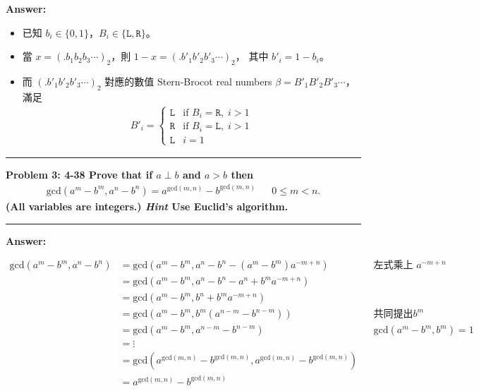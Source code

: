 \documentclass[11pt]{article}
\newcommand\question[2]{\vspace{.25in}\hrule\textbf{#1: #2}\vspace{.5em}\hrule\vspace{.10in}}
\renewcommand\part[1]{\vspace{.10in}\textbf{#1}}
\begin{document}
\part{Answer:}

\begin{itemize}
	\item 已知 $b_i \in \{0, 1\}$，$B_i \in \{\texttt{L}, \texttt{R}\}$。
	\item 當 $x = (.b_1 b_2 b_3 \cdots)_2$，則 $1-x = (.b'_1 b'_2 b'_3 \cdots)_2$，
		其中 $b'_i = 1 - b_i$。
	\item 而 $(.b'_1 b'_2 b'_3 \cdots)_2$ 對應的數值 Stern-Brocot real numbers 
		$\beta = B'_1 B'_2 B'_3 \cdots$，滿足
		\begin{align*}
			B'_i = \left\{\begin{matrix}
				\texttt{L} & \text{if } B_i = \texttt{R}, \; i > 1 \\
				\texttt{R} & \text{if } B_i = \texttt{L}, \; i > 1 \\
				\texttt{L} & i = 1
			\end{matrix}\right.
		\end{align*}
\end{itemize}

\question{Problem 3} {4-38 Prove that if $a \perp b$ and $a > b$ then
	\begin{align*}	
		\text{gcd}(a^m - b^m, a^n - b^n) = a^{\text{gcd}(m, n)}
			- b^{\text{gcd}(m, n)} && 0 \le m < n.
	\end{align*}
	(All variables are integers.) \textit{Hint} Use Euclid's algorithm.
}

\part{Answer:}

\begin{align*}
	\text{gcd}(a^m - b^m, a^n - b^n) 
		&= \text{gcd}(a^m - b^m, a^n - b^n - (a^m - b^m) a^{-m+n}) && \text{左式乘上 } a^{-m+n}\\
		&= \text{gcd}(a^m - b^m, a^n - b^n - a^n + b^m a^{-m+n}) \\
		&= \text{gcd}(a^m - b^m, b^n + b^m a^{-m+n}) \\
		&= \text{gcd}(a^m - b^m, b^m (a^{n-m} - b^{n-m})) && \text{共同提出} b^m\\
		&= \text{gcd}(a^m - b^m, a^{n-m} - b^{n-m}) && \text{gcd}(a^m - b^m, b^m) = 1\\
		&= \vdots \\
		&= \text{gcd}(a^{\text{gcd}(m, n)} - b^{\text{gcd}(m, n)}, a^{\text{gcd}(m, n)} - b^{\text{gcd}(m, n)}) \\
		&= a^{\text{gcd}(m, n)} - b^{\text{gcd}(m, n)}
\end{align*}
\end{document}
